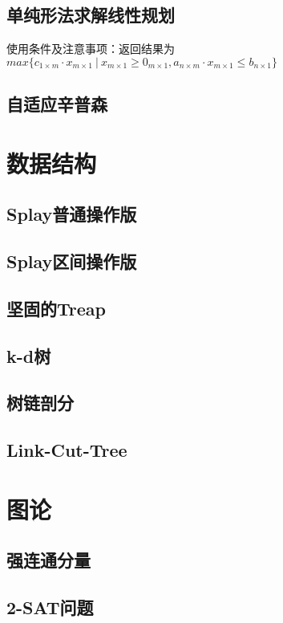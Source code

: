 \documentclass[openany, a4paper, 10pt]{book}
\begin{document}
\begin{spacing}{1.0}
		\section{单纯形法求解线性规划}
			使用条件及注意事项：返回结果为$max\{c_{1 \times m} \cdot x_{m \times 1} \ | \ x_{m \times 1} \geq 0_{m \times 1}, a_{n \times m} \cdot x_{m \times 1} \leq b_{n \times 1}\}$
			
		\section{自适应辛普森}
			
	\chapter{数据结构}
		\section{Splay普通操作版}
		\section{Splay区间操作版}
		\section{坚固的Treap}
		\section{k-d树}
		\section{树链剖分}
		\section{Link-Cut-Tree}
	\chapter{图论}
		\section{强连通分量}
			
		\section{2-SAT问题}
			

\end{spacing}
\end{document}
